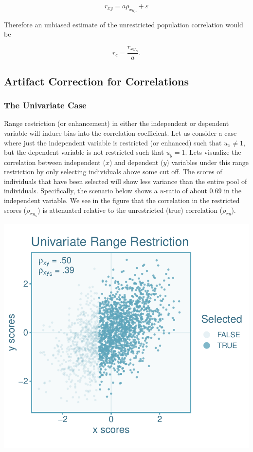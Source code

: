 \documentclass[
  letterpaper,
  DIV=11,
  numbers=noendperiod]{scrreprt}
\begin{document}
\[
r_{xy} = a \rho_{xy_S} + \varepsilon  
\]

Therefore an unbiased estimate of the unrestricted population
correlation would be

\[
r_c = \frac{ r_{xy_S} }{ a}.
\]

\hypertarget{artifact-correction-for-correlations}{%
\subsection{Artifact Correction for
Correlations}\label{artifact-correction-for-correlations}}

\hypertarget{the-univariate-case-1}{%
\subsubsection*{The Univariate Case}\label{the-univariate-case-1}}

Range restriction (or enhancement) in either the independent or
dependent variable will induce bias into the correlation coefficient.
Let us consider a case where just the independent variable is restricted
(or enhanced) such that \(u_x\neq 1\), but the dependent variable is not
restricted such that \(u_y = 1\). Lets visualize the correlation between
independent (\(x\)) and dependent (\(y\)) variables under this range
restriction by only selecting individuals above some cut off. The scores
of individuals that have been selected will show less variance than the
entire pool of individuals. Specifically, the scenario below shows a
\(u\)-ratio of about 0.69 in the independent variable. We see in the
figure that the correlation in the restricted scores (\(\rho_{xy_S}\))
is attenuated relative to the unrestricted (true) correlation
(\(\rho_{xy}\)).

\includegraphics{direct_range_restriction_files/figure-pdf/unnamed-chunk-2-1.pdf}
\end{document}
